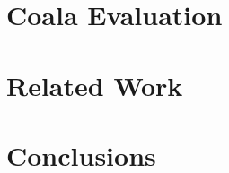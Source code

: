 \documentclass[acmsmall,review,anonymous]{acmart}\settopmatter{printfolios=true,printccs=false,printacmref=false}
\newcommand{\sys}{Coala\xspace}
\begin{document}


\section{\sys Evaluation}
\label{sec:evaluation}



\section{Related Work}
\label{sec:related_work}



\section{Conclusions}
\label{sec:conclusions}




\end{document}
